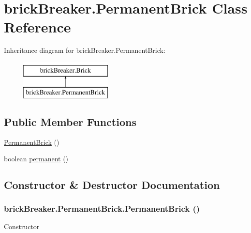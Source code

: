 \hypertarget{classbrick_breaker_1_1_permanent_brick}{
\section{brickBreaker.PermanentBrick Class Reference}
\label{classbrick_breaker_1_1_permanent_brick}
}
Inheritance diagram for brickBreaker.PermanentBrick:\begin{figure}[H]
\begin{center}
\leavevmode
\includegraphics[height=2cm]{classbrick_breaker_1_1_permanent_brick}
\end{center}
\end{figure}
\subsection*{Public Member Functions}
\begin{DoxyCompactItemize}
\item 
\hyperlink{classbrick_breaker_1_1_permanent_brick_acb1d6072727e429556038041cfcf411a}{PermanentBrick} ()
\item 
boolean \hyperlink{classbrick_breaker_1_1_permanent_brick_a5095518bc2226f3257202d99e37d8ae4}{permanent} ()
\end{DoxyCompactItemize}


\subsection{Constructor \& Destructor Documentation}
\hypertarget{classbrick_breaker_1_1_permanent_brick_acb1d6072727e429556038041cfcf411a}{
\subsubsection[{PermanentBrick}]{\setlength{\rightskip}{0pt plus 5cm}brickBreaker.PermanentBrick.PermanentBrick ()}}
\label{classbrick_breaker_1_1_permanent_brick_acb1d6072727e429556038041cfcf411a}
Constructor 

